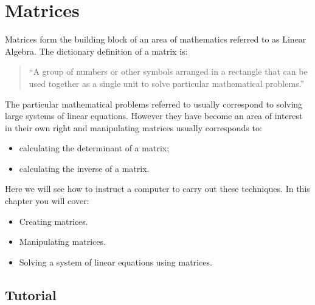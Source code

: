 \chapter{Matrices}
\label{\detokenize{tools-for-mathematics/04-matrices/introduction/main:matrices}}\label{\detokenize{tools-for-mathematics/04-matrices/introduction/main::doc}}

Matrices form the building block of an area of mathematics referred to as Linear
Algebra. The dictionary definition of a matrix is:
\begin{quote}
``A group of numbers or other symbols arranged in a rectangle that can be used
together as a single unit to solve particular mathematical problems.''
\end{quote}


The particular mathematical problems referred to usually correspond to solving large
systems of linear equations. However they have become an area of interest in
their own right and manipulating matrices usually corresponds to:
\begin{itemize}
\item 

calculating the determinant of a matrix;

\item 

calculating the inverse of a matrix.

\end{itemize}


Here we will see how to instruct a computer to carry out these techniques.
In this chapter you will cover:

\begin{itemize}
\item 

Creating matrices.

\item 

Manipulating matrices.

\item 

Solving a system of linear equations using matrices.

\end{itemize}





\section{Tutorial}
\label{\detokenize{tools-for-mathematics/04-matrices/tutorial/main:tutorial}}\label{\detokenize{tools-for-mathematics/04-matrices/tutorial/main::doc}}

